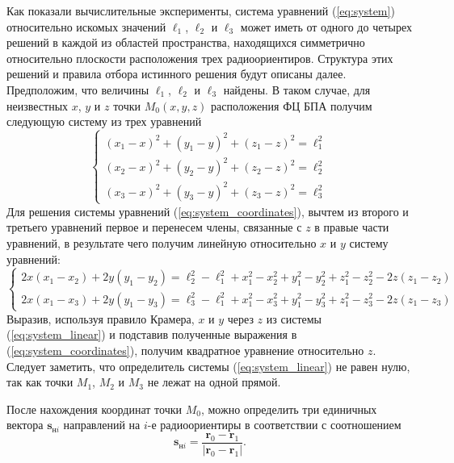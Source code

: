 \documentclass[a4paper,12pt]{article}
\begin{document}
Как показали вычислительные эксперименты, система уравнений (\ref{eq:system}) относительно искомых значений
$\ell_1$, $\ell_2$ и $\ell_3$ может иметь от одного до четырех решений в каждой из областей пространства, находящихся
симметрично относительно плоскости расположения трех радиоориентиров. Структура этих решений и правила отбора
истинного решения будут описаны далее. Предположим, что величины $\ell_1$, $\ell_2$ и $\ell_3$ найдены. В таком
случае, для неизвестных $x$, $y$ и $z$ точки $M_0\left(x, y, z\right)$ расположения ФЦ БПА получим следующую
систему из трех уравнений
\begin{equation}\label{eq:system_coordinates}
    \begin{cases}
        \left(x_1 - x\right)^2 + \left(y_1 - y\right)^2 + \left(z_1 - z\right)^2 = \ell_1^2 \\
        \left(x_2 - x\right)^2 + \left(y_2 - y\right)^2 + \left(z_2 - z\right)^2 = \ell_2^2 \\
        \left(x_3 - x\right)^2 + \left(y_3 - y\right)^2 + \left(z_3 - z\right)^2 = \ell_3^2
    \end{cases}
\end{equation}
Для решения системы уравнений (\ref{eq:system_coordinates}), вычтем из второго и третьего уравнений первое и перенесем
члены, связанные с $z$ в правые части уравнений, в результате чего получим линейную относительно $x$ и $y$ систему уравнений:
\begin{equation}\label{eq:system_linear}
    \begin{cases}
        2x \left(x_1 - x_2\right) + 2 y \left(y_1 - y_2\right) =\ell_2^2 - \ell_1^2 + x_1^2 - x_2^2 + y_1^2 - y_2^2 + z_1^2 - z_2^2 - 2z\left(z_1 - z_2\right) \\
        2x \left(x_1 - x_3\right) + 2 y \left(y_1 - y_3\right) =\ell_3^2 - \ell_1^2 + x_1^2 - x_3^2 + y_1^2 - y_3^2 + z_1^2 - z_3^2 - 2z\left(z_1 - z_3\right)
    \end{cases}
\end{equation}
Выразив, используя правило Крамера, $x$ и $y$ через $z$ из системы (\ref{eq:system_linear}) и подставив полученные выражения в
(\ref{eq:system_coordinates}), получим квадратное уравнение относительно $z$. Следует заметить, что определитель системы
(\ref{eq:system_linear}) не равен нулю, так как точки $M_1$, $M_2$ и $M_3$ не лежат на одной прямой.

После нахождения координат точки $M_0$, можно определить три единичных вектора $\mathbf{s}_{\text{н}i}$ направлений на $i$-е радиоориентиры
в соответствии с соотношением
\begin{equation*}
    \mathbf{s}_{\text{н}i} = \frac{\mathbf{r}_0 - \mathbf{r}_1}{|\mathbf{r}_0 - \mathbf{r}_1|}.
\end{equation*}
\end{document}
